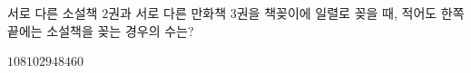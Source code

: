 \hspace*{2mm}\begin{minipage}[t]{\dimexpr\linewidth-2mm\relax}\vspace{0pt}
서로 다른 소설책 $2$권과 서로 다른 만화책 $3$권을 책꽂이에 일렬로 꽂을 때, 적어도 한쪽 끝에는 소설책을 꽂는 경우의 수는?
\begin{choices32}{$108$}{$102$}{$94$}{$84$}{$60$}\end{choices32}\end{minipage}
